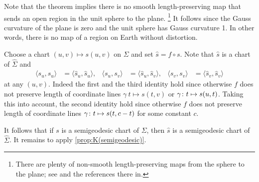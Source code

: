Note that the theorem implies there is no smooth length-preserving map that sends an open region in the unit sphere to the plane.%
\footnote{There are plenty of non-smooth length-preserving maps from the sphere to the plane; see \cite{petrunin-yashinski} and the references there in.}
It follows since the Gauss curvature of the plane is zero and the unit sphere has Gauss curvature 1. 
In other words, there is no map of a region on Earth without distortion.

 Choose a chart $(u,v)\mapsto s(u,v)$ on $\Sigma$ and set
$\hat s =f\circ s$.
Note that $\hat s$ is a chart of $\hat{\Sigma}$ and 
\begin{align*}
\langle s_u,s_u\rangle
&=
\langle \hat s_u, \hat s_u\rangle,
&
\langle s_u, s_v\rangle
&=
\langle \hat s_u, \hat s_v\rangle,
&
\langle s_v, s_v\rangle
&=
\langle \hat s_v, \hat s_v\rangle
\end{align*}
at any $(u,v)$.
Indeed the first and the third identity hold since otherwise $f$ does not preserve length of coordinate lines $\gamma\:t\mapsto s(t,v)$ or  $\gamma\:t\z\mapsto s(u,t)$.
Taking this into account, the second identity hold since otherwise $f$ does not preserve length of coordinate lines $\gamma\:t\z\mapsto s(t,c-t)$ for some constant $c$.

It follows that if $s$ is a semigeodesic chart of $\Sigma$,
then $\hat s$ is a semigeodesic chart of $\hat{\Sigma}$.
It remains to apply \ref{prop:K(semigeodesic)}.
\qeds
